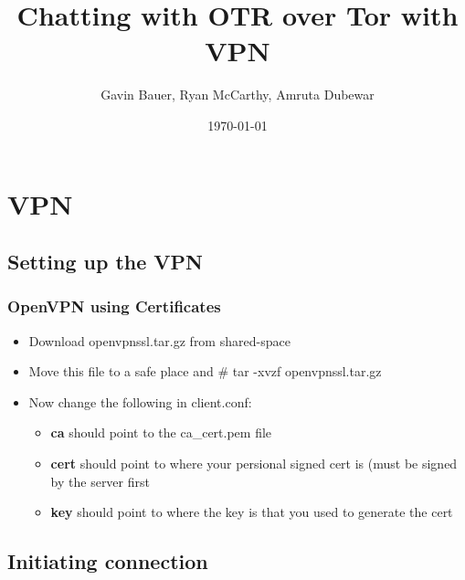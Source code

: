 \documentclass{beamer}
\title{Chatting with OTR over Tor with VPN}
\author{Gavin Bauer, Ryan McCarthy, Amruta Dubewar}
\date{\today}
\begin{document}
\begin{frame}
\maketitle
\end{frame}
\section{VPN}
\subsection{Setting up the VPN}
\begin{frame}
\frametitle{OpenVPN using Certificates}
\begin{itemize}
\item Download openvpnssl.tar.gz from shared-space\\
\item Move this file to a safe place and \# tar -xvzf openvpnssl.tar.gz\\
\item Now change the following in client.conf:
\begin{itemize}
\item \textbf{ca} should point to the ca\_cert.pem file
\item \textbf{cert} should point to where your persional signed cert is (must be signed by the server first
\item \textbf{key} should point to where the key is that you used to generate the cert

\end{itemize}

\end{itemize}
\end{frame}
\subsection{Initiating connection}

\end{document}
